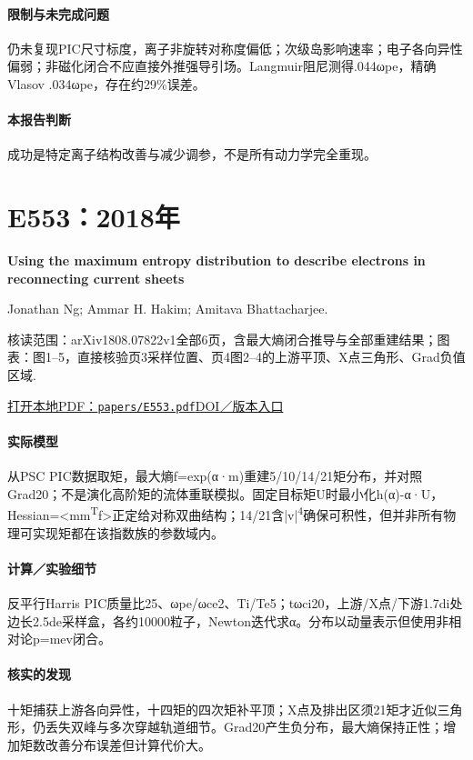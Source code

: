 \paragraph{限制与未完成问题}仍未复现PIC尺寸标度，离子非旋转对称度偏低；次级岛影响速率；电子各向异性偏弱；非磁化闭合不应直接外推强导引场。Langmuir阻尼测得.044ωpe，精确Vlasov .034ωpe，存在约29\%误差。

\paragraph{本报告判断}成功是特定离子结构改善与减少调参，不是所有动力学完全重现。

\section{E553：2018年}\label{paper:E553}

\textbf{Using the maximum entropy distribution to describe electrons in reconnecting current sheets}\citep{E553}\

Jonathan Ng;  Ammar H. Hakim;  Amitava Bhattacharjee.

\textsf{核读范围：}arXiv1808.07822v1全部6页，含最大熵闭合推导与全部重建结果；\textsf{图表：}图1–5，直接核验页3采样位置、页4图2–4的上游平顶、X点三角形、Grad负值区域.

\href{run:papers/E553.pdf}{打开本地PDF：\texttt{papers/E553.pdf}}\quad\href{https://doi.org/10.1063/1.5041758}{DOI／版本入口}

\paragraph{实际模型}从PSC PIC数据取矩，最大熵f=exp(α·m)重建5/10/14/21矩分布，并对照Grad20；不是演化高阶矩的流体重联模拟。固定目标矩U时最小化h(α)-α·U，Hessian=<mm\textsuperscript{T}f>正定给对称双曲结构；14/21含|v|\textsuperscript{4}确保可积性，但并非所有物理可实现矩都在该指数族的参数域内。

\paragraph{计算／实验细节}反平行Harris PIC质量比25、ωpe/ωce2、Ti/Te5；tωci20，上游/X点/下游1.7di处边长2.5de采样盒，各约10000粒子，Newton迭代求α。分布以动量表示但使用非相对论p=mev闭合。

\paragraph{核实的发现}十矩捕获上游各向异性，十四矩的四次矩补平顶；X点及排出区须21矩才近似三角形，仍丢失双峰与多次穿越轨道细节。Grad20产生负分布，最大熵保持正性；增加矩数改善分布误差但计算代价大。

